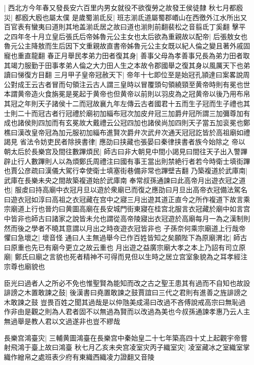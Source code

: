 |{
	西北方今年春又發長安六百里内男女就役不欲復勞之故發王侯徒隸}
秋七月都廏災|{
	都廏大廏也屬太僕}
是歲蜀湔氐反|{
	班志湔氐道屬蜀郡㟭山在西徼外江水所出又百官表有蠻夷曰道則其地盖湔氐居之故曰道也湔則前翻裴松之音翦氐丁奚翻}
擊平之四年冬十月立皇后張氏后帝姊魯元公主女也太后欲為重親故以配帝|{
	后張敖女也魯元公主降敖而生后因下文重親故直書帝姊魯元公主女既以紀人倫之變且著外戚固寵也重直龍翻}
春正月舉民孝弟力田者復其身|{
	善事父母為孝善事兄長為弟力田者取其竭力服勤于田事孝弟人倫之大力田人生之本故令郡國舉之復其身以風厲天下也弟讀曰悌復方目翻}
三月甲子皇帝冠赦天下|{
	帝年十七即位至是始冠孔頴達曰案畧說周公對成王云古者冒而句領注云古人謂三皇時以冒覆頭句領繞頸至黄帝時則有冕也世本謂黄帝造火食旃冕是冕起于黄帝也但黄帝以前則以羽皮為之冠黄帝以後乃用布帛其冠之年則天子諸侯十二而冠故襄九年左傳云古者國君十五而生子冠而生子禮也其士則二十而冠古者行冠禮於廟初加緇布冠次加皮弁冠三加爵弁冠所謂三加彌尊加有成也諸侯則四加而有玄冕故大戴禮云公冠四加也諸侯尚加四則天子當五加衮冕也鄭樵曰漢改皇帝冠為加元服初加緇布進賢次爵弁次武弁次通天冠冠訖皆於高祖廟如禮謁見}
省法令妨吏民者除挾書律|{
	應劭曰挟藏也張晏曰秦律挟書者族今始除之}
帝以朝太后於長樂宫及間往數蹕煩民|{
	師古曰非大朝見中間小謁見曰間往天子出入警蹕辟止行人數蹕則人以為煩鄭氏周禮注曰國有事王當出則禁絶行者若今時衛士填街蹕也賈公彦疏曰漢儀大駕行幸使衛士填塞街巷備非常也蹕壁吉翻}
乃築複道於武庫南|{
	武庫在長樂未央之間故築複道始於武庫南}
奉常叔孫通諫曰此高帝月出遊衣冠之道也|{
	服䖍曰持高廟中衣冠月旦以遊於衆廟已而復之應劭曰月旦出高帝衣冠備法駕名曰遊衣冠如淳曰高祖之衣冠藏在宫中之寢三月出遊其道正直今之所作複道下故言乘宗廟道上行也晉灼曰黄圖高廟在長安城門街東寢在桂宫北服言衣冠藏於廟中如言宫中皆非也師古曰諸家之說皆未允也謂從高帝陵寢出衣冠遊於高廟每月一為之漢制則然而後之學者不曉其意謂以月出之時夜遊衣冠皆非也}
子孫奈何乘宗廟道上行哉帝懼曰急壞之|{
	壞音怪}
通曰人主無過舉今已作百姓皆知之矣願陛下為原廟渭北|{
	師古曰原重也先已有廟今更立之故云重也}
月出遊之益廣宗廟大孝之本上乃詔有司立原廟|{
	鄭氏曰廟之言貌也死者精神不可得而見但以生時之居立宫室象貌為之耳孝經注宗尊也廟貌也}


臣光曰過者人之所必不免也惟聖賢為能知而改之古之聖王患其有過而不自知也故設誹謗之木置敢諫之鼓|{
	後漢書曰堯置敢諫之鼓賈誼曰三代之君則有進善之旌誹謗之木敢諫之鼓}
豈畏百姓之聞其過哉是以仲虺美成湯曰改過不吝傅說戒高宗曰無恥過作非由是觀之則為人君者固不以無過為賢而以改過為美也今叔孫通諫孝惠乃云人主無過舉是教人君以文過遂非也豈不繆哉

長樂宫鴻臺灾|{
	三輔黄圖鴻臺在長樂宫中秦始皇二十七年築高四十丈上起觀宇帝嘗射飛鴻于臺上故曰鴻臺}
秋七月乙亥未央宫凌室灾丙子織室灾|{
	凌室藏冰之室織室掌織作繒帛之處班表少府有東織西織凌力證翻又音陵}


